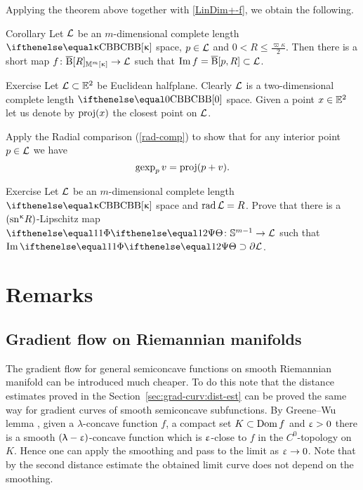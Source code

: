 Applying the theorem above together with \ref{LinDim+-f},
we obtain the following.

\begin{thm}{Corollary}\label{cor:short-map-to-ball}
Let $\mathcal{L}$ be an $m$-dimensional complete length $\Alex\kappa$ space, $p\in\spc{L}$ and $0<R\le\tfrac{\varpi\kappa}2$.
Then there is a short map 
$f\:\cBall[R]_{\Lob{m}{\kappa}}\to \spc{L}$
such that $\Im f= \cBall[p,R]\subset \spc{L}$.
\end{thm}







\begin{thm}{Exercise}
\label{ex:gexp} 
Let $\spc{L}\subset\EE^2$ be Euclidean halfplane. 
Clearly $\mathcal{L}$ is a two-dimensional complete length $\Alex{0}$ space.
Given a point $x\in \EE^2$ let us denote by $\mathop{\rm proj}\nolimits(x)$ the closest point on $\mathcal{L}$. 

Apply the Radial comparison (\ref{rad-comp}) to show that for any interior point $p\in \spc{L}$ we have 
\[\mathop{\rm gexp}\nolimits_p v=\mathop{\rm proj}\nolimits(p+v).\]
\end{thm}


\begin{thm}{Exercise}
Let $\mathcal{L}$ be an $m$-dimensional complete length $\Alex\kappa$ space and $\mathop{\rm rad}\nolimits\mathcal{L}=R$.
Prove that there is a $(\mathrm{sn}^{\upkappa} R)$-Lipschitz map $\map\:\SS^{m-1}\to\spc{L}$ such that $\Im\map\supset\partial\spc{L}$.
\end{thm}



\section{Remarks}

\subsection*{Gradient flow on Riemannian manifolds}
The gradient flow for general semiconcave functions 
on smooth Riemannian manifold  can be introduced much cheaper.
To do this note that the distance estimates proved in the Section~\ref{sec:grad-curv:dist-est}
can be proved the same way for gradient curves of smooth semiconcave subfunctions.
By Greene--Wu lemma \cite{greene-wu}, 
given 
a $\lambda$-concave function $f$, 
a compact set $K\subset \Dom f$
and $\upvarepsilon>0$
there is a smooth $(\uplambda-\upvarepsilon)$-concave function which is 
$\upvarepsilon$-close to $f$ in the $C^0$-topology on $K$.
Hence one can apply the smoothing and pass to the limit as $\eps\to0$.
Note that by the second distance estimate the obtained limit curve does not depend on the smoothing.

